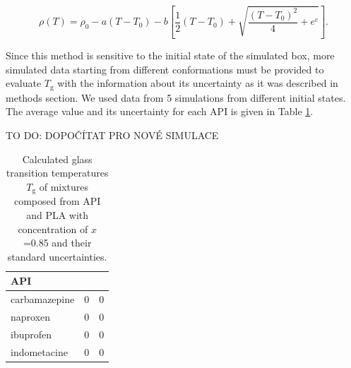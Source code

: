 \begin{equation}\label{eq:fit}
	\rho(T)=\rho_0-a\left(T-T_0\right)-b\left[\frac{1}{2}\left(T-T_0\right)+\sqrt{\frac{\left(T-T_0\right)^2}{4}+e^c}\right].
\end{equation}

Since this method is sensitive to the initial state of the simulated box, more simulated data starting from different conformations must be provided to evaluate $T_\text{g}$ with the information about its uncertainty as it was described in methods section. We used data from 5 simulations from different initial states. The average value and its uncertainty for each API is given in Table \ref{tab:Tg_mix}.

TO DO: DOPOČÍTAT PRO NOVÉ SIMULACE
\begin{table}[htb!]
	\caption{Calculated glass transition temperatures $T_\text{g}$ of mixtures composed from API and PLA with concentration of $x$=0.85 and their standard uncertainties.}
	\centering
	\begin{tabular}{lcc} \toprule
		{\textbf{API}} & {\textbf{\boldmath{$T_{\text{g}}$}}} & \textbf{{\boldmath{$\sigma_{T_\text{g}}$}}} \\
		\midrule
		carbamazepine  & 0 & 0 \\		
		naproxen   & 0 & 0 \\
		ibuprofen  & 0 & 0 \\
		indometacine  & 0 & 0 \\
		\bottomrule
	\end{tabular}
	\label{tab:Tg_mix} 
\end{table} 

